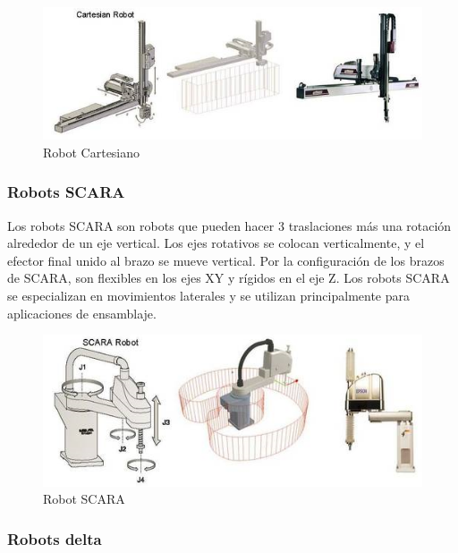         \begin{figure}[htb]
            \centering
            \includegraphics[width=0.9\linewidth]{Main/Chapter2/Images2/Robot-cartesiano.png}
            \caption{Robot Cartesiano}
            \label{f:Cap2_segunMovimiento_cartesiano}
        \end{figure}
        
        \newpage

        
        \subsubsection{Robots SCARA}
        
        Los robots SCARA son robots que pueden hacer 3 traslaciones más una rotación alrededor de un eje vertical. Los ejes rotativos se colocan verticalmente, y el efector final unido al brazo se mueve vertical. Por la configuración de los brazos de SCARA, son flexibles en los ejes XY y rígidos en el eje Z. Los robots SCARA se especializan en movimientos laterales y se utilizan principalmente para aplicaciones de ensamblaje. 
        
        \begin{figure}[htb]
            \centering
            \includegraphics[width=0.9\linewidth]{Main/Chapter2/Images2/Robot-SCARA.png}
            \caption{Robot SCARA}
            \label{f:Cap2_segunMovimiento_scara}
        \end{figure}
        
        \subsubsection{Robots delta}
        
